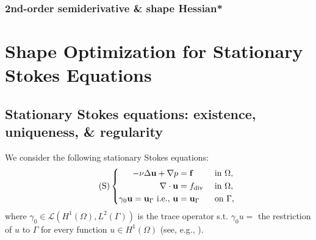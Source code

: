 \documentclass[oneside]{book}
\numberwithin{equation}{section}
\begin{document}
\subsection{2nd-order semiderivative \& shape Hessian*}


\chapter{Shape Optimization for Stationary Stokes Equations}

\section{Stationary Stokes equations: existence, uniqueness, \& regularity}
We consider the following stationary Stokes equations:
\begin{equation}
    \label{stationary Stokes}
    \tag{S}
    \left\{\begin{split}
        -\nu\Delta{\bf u} + \nabla p &= {\bf f} &&\mbox{ in } \Omega,\\
        \nabla\cdot{\bf u} &= f_{\rm div} &&\mbox{ in } \Omega,\\
        \gamma_0{\bf u} = {\bf u}_\Gamma \mbox{ i.e., } {\bf u} &= {\bf u}_\Gamma &&\mbox{ on } \Gamma,
    \end{split}\right.
\end{equation}
where $\gamma_0\in\mathcal{L}(H^1(\Omega),L^2(\Gamma))$ is the trace operator s.t. $\gamma_0u =$ the restriction of $u$ to $\Gamma$ for every function $u\in H^1(\Omega)$ (see, e.g., \cite[p. 6]{Temam2000}).
\end{document}
